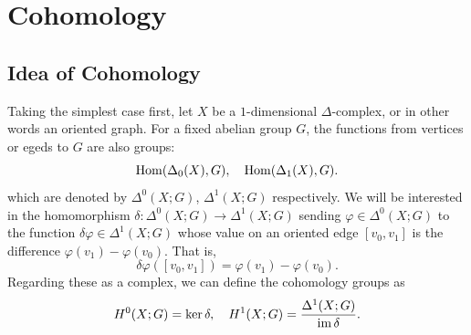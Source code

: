 \chapter{Cohomology}
\section{Idea of Cohomology}
Taking the simplest case first, let $X$ be a $1$-dimensional $\Delta$-complex, or in other words an oriented graph. For a fixed abelian group $G$, the functions from vertices or egeds to $G$ are also groups:
\[\mathrm{Hom}(\Delta_0(X),G),\quad\mathrm{Hom}(\Delta_1(X),G).\]
which are denoted by $\Delta^0(X;G)$, $\Delta^1(X;G)$ respectively. We will be interested in the homomorphism $\delta:\Delta^0(X;G)\to\Delta^1(X;G)$
sending $\varphi\in\Delta^0(X;G)$ to the function $\delta\varphi\in\Delta^1(X;G)$ whose value on an oriented edge $[v_0,v_1]$ is the difference $\varphi(v_1)-\varphi(v_0)$. That is,
\[\delta\varphi([v_0,v_1])=\varphi(v_1)-\varphi(v_0).\]
Regarding these as a complex, we can define the cohomology groups as
\[H^0(X;G)=\mathrm{ker}\,\delta,\quad H^1(X;G)=\dfrac{\Delta^1(X;G)}{\mathrm{im}\,\delta}.\]
